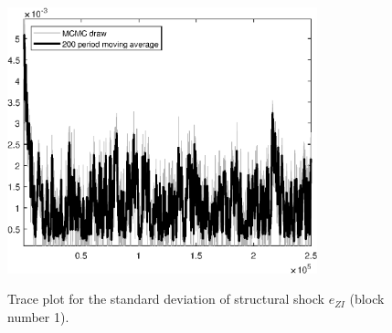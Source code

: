 \begin{figure}[H]
\centering
  \includegraphics[width=0.8\textwidth]{BRS_aggregate/graphs/TracePlot_SE_e_ZI_blck_1}\\
    \caption{Trace plot for the standard deviation of structural shock ${e_{ZI}}$ (block number 1).}
\end{figure}
